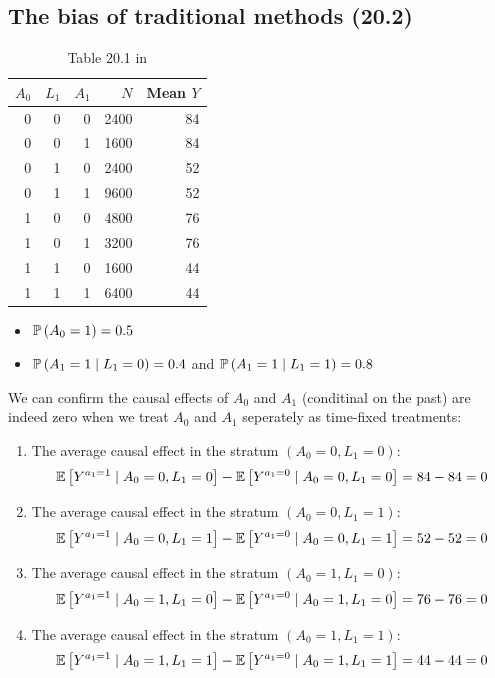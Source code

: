 \documentclass[11pt,a4paper,twoside]{book}\usepackage[]{graphicx}\usepackage[]{xcolor}
\begin{document}
\subsection{The bias of traditional methods (20.2)}

\begin{table}[H]
\caption{Table 20.1 in \cite{hernan2023}}
\centering
\begingroup\footnotesize
\begin{tabular}{rrrrr}
  \toprule
$A_0$ & $L_1$ & $A_1$ & $N$ & Mean $Y$ \\ 
  \midrule
0 & 0 & 0 & 2400 & 84 \\ 
  0 & 0 & 1 & 1600 & 84 \\ 
  0 & 1 & 0 & 2400 & 52 \\ 
  0 & 1 & 1 & 9600 & 52 \\ 
  1 & 0 & 0 & 4800 & 76 \\ 
  1 & 0 & 1 & 3200 & 76 \\ 
  1 & 1 & 0 & 1600 & 44 \\ 
  1 & 1 & 1 & 6400 & 44 \\ 
   \bottomrule
\end{tabular}
\endgroup

\end{table}
\begin{itemize}
\item $\P\left(A_0=1\right)=0.5$
\item $\P\left(A_1=1\mid L_1=0\right)=0.4$ and $\P\left(A_1=1\mid L_1=1\right)=0.8$
\end{itemize}


We can confirm the causal effects of $A_0$ and $A_1$ (conditinal on the past) are indeed zero when we treat $A_0$ and $A_1$ seperately as time-fixed treatments:
\begin{enumerate}
\item The average causal effect in the stratum $(A_0=0,L_1=0)$:
\begin{align*}
\E\left[Y^{a_1=1}\mid A_0=0,L_1=0\right]-\E\left[Y^{a_1=0}\mid A_0=0,L_1=0\right]=84-84=0
\end{align*}
\item The average causal effect in the stratum $(A_0=0,L_1=1)$:
\begin{align*}
\E\left[Y^{a_1=1}\mid A_0=0,L_1=1\right]-\E\left[Y^{a_1=0}\mid A_0=0,L_1=1\right]=52-52=0
\end{align*}
\item The average causal effect in the stratum $(A_0=1,L_1=0)$:
\begin{align*}
\E\left[Y^{a_1=1}\mid A_0=1,L_1=0\right]-\E\left[Y^{a_1=0}\mid A_0=1,L_1=0\right]=76-76=0
\end{align*}
\item The average causal effect in the stratum $(A_0=1,L_1=1)$:
\begin{align*}
\E\left[Y^{a_1=1}\mid A_0=1,L_1=1\right]-\E\left[Y^{a_1=0}\mid A_0=1,L_1=1\right]=44-44=0
\end{align*}
\end{enumerate}
\end{document}

